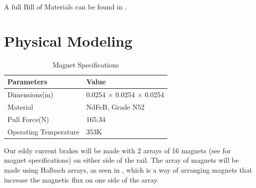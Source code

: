 \documentclass[main.tex]{subfiles}
\begin{document}
    A full Bill of Materials can be found in .

    \section{Physical Modeling}
    \begin{table}
    	\centering
    	\begin{tabular}{@{}ll@{}} \toprule
            Parameters & Value\\ \midrule
            Dimensions(\si{m})     & 0.0254 $\times$ 0.0254 $\times$ 0.0254 \\
            Material     & NdFeB, Grade N52   \\
            Pull Force(\si{N})     & 165.34 \\
            Operating Temperature     & 353K  \\ \bottomrule
        \end{tabular}
        \caption{Magnet Specifications}
        \label{table:magnets}
    \end{table}
    Our eddy current brakes will be made with 2 arrays of 16 magnets (see  for magnet specifications) on either side of the rail. The array of magnets will be made using Halbach arrays, as seen in , which is a way of arranging magnets that increase the magnetic flux on one side of the array.\\
\end{document}
